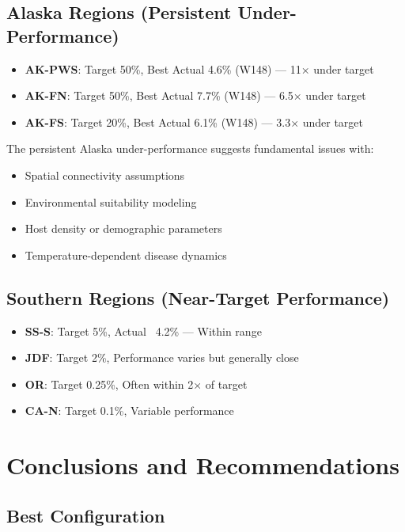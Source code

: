 \documentclass[11pt]{article}
\begin{document}
\subsection{Alaska Regions (Persistent Under-Performance)}

\begin{itemize}
\item \textbf{AK-PWS}: Target 50\%, Best Actual 4.6\% (W148) — 11× under target
\item \textbf{AK-FN}: Target 50\%, Best Actual 7.7\% (W148) — 6.5× under target  
\item \textbf{AK-FS}: Target 20\%, Best Actual 6.1\% (W148) — 3.3× under target
\end{itemize}

The persistent Alaska under-performance suggests fundamental issues with:
\begin{itemize}
\item Spatial connectivity assumptions
\item Environmental suitability modeling  
\item Host density or demographic parameters
\item Temperature-dependent disease dynamics
\end{itemize}

\subsection{Southern Regions (Near-Target Performance)}

\begin{itemize}
\item \textbf{SS-S}: Target 5\%, Actual ~4.2\% — Within range
\item \textbf{JDF}: Target 2\%, Performance varies but generally close
\item \textbf{OR}: Target 0.25\%, Often within 2× of target
\item \textbf{CA-N}: Target 0.1\%, Variable performance
\end{itemize}

\section{Conclusions and Recommendations}

\subsection{Best Configuration}
\end{document}
